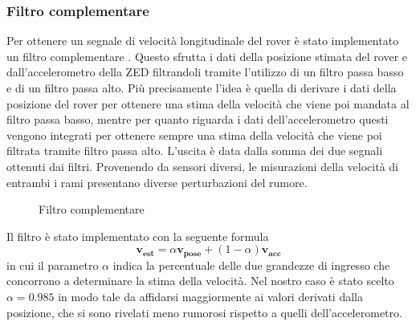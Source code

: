 \subsubsection{Filtro complementare}
Per ottenere un segnale di velocità longitudinale del rover è stato implementato un filtro complementare \cite{Filtrocompelmentare}. Questo sfrutta i dati della posizione stimata del rover e dall'accelerometro della ZED filtrandoli tramite l'utilizzo di un filtro passa basso e di un filtro passa alto. Più precisamente l'idea è quella di derivare i dati della posizione del rover per ottenere una stima della velocità che viene poi mandata al filtro passa basso, mentre per quanto riguarda i dati dell'accelerometro questi vengono integrati per ottenere sempre una stima della velocità che viene poi filtrata tramite filtro passa alto.
L'uscita è data dalla somma dei due segnali ottenuti dai filtri.
Provenendo da sensori diversi, le misurazioni della velocità di entrambi i rami presentano diverse perturbazioni del rumore.
\begin{figure} [H]
    \centering
    
    \caption{Filtro complementare}
    \label{fig:Filtro complementare}
\end{figure} 
\noindent
Il filtro è stato implementato con la seguente formula
\begin{equation}
\boldsymbol{v_{est}}=\alpha \boldsymbol{v_{pose}}+(1-\alpha) \boldsymbol{v_{acc}}
\end{equation} 
in cui il parametro $\alpha$ indica la percentuale delle due grandezze di ingresso che concorrono a determinare la stima della velocità.
Nel nostro caso è stato scelto $\alpha= 0.985$ in modo tale da affidarsi maggiormente ai valori derivati dalla posizione, che si sono rivelati meno rumorosi rispetto a quelli dell'accelerometro.     
